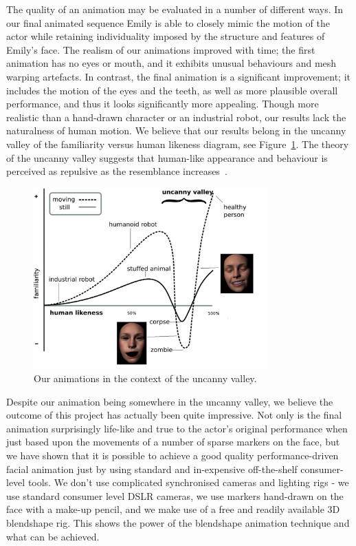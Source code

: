 The quality of an animation may be evaluated in a number of different ways. In our final animated sequence Emily is able to closely mimic the motion of the actor while retaining individuality imposed by the structure and features of Emily's face. The realism of our animations improved with time; the first animation has no eyes or mouth, and it exhibits unusual behaviours and mesh warping artefacts. In contrast, the final animation is a significant improvement; it includes the motion of the eyes and the teeth, as well as more plausible overall performance, and thus it looks significantly more appealing. Though more realistic than a hand-drawn character or an industrial robot, our results lack the naturalness of human motion. We believe that our results belong in the uncanny valley of the familiarity versus human likeness diagram, see Figure~\ref{fig:UV}. The theory of the uncanny valley suggests that human-like appearance and behaviour is perceived as repulsive as the resemblance increases~\cite{UV}.
\begin{figure}[htbp!]
\centering
\includegraphics[width=0.8\textwidth]{img/UV}
	\caption{Our animations in the context of the uncanny valley.}
	\label{fig:UV}
\end{figure}

Despite our animation being somewhere in the uncanny valley, we believe the outcome of this project has actually been quite impressive. Not only is the final animation surprisingly life-like and true to the actor's original performance when just based upon the movements of a number of sparse markers on the face, but we have shown that it is possible to achieve a good quality performance-driven facial animation just by using standard and in-expensive off-the-shelf consumer-level tools. We don't use complicated synchronised cameras and lighting rigs - we use standard consumer level DSLR cameras, we use markers hand-drawn on the face with a make-up pencil, and we make use of a free and readily available 3D blendshape rig. This shows the power of the blendshape animation technique and what can be achieved.

